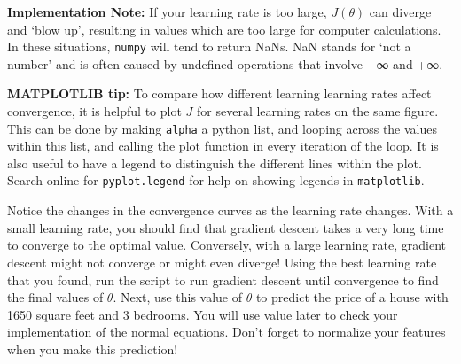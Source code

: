 \documentclass[11pt]{article}
\begin{document}
\textbf{Implementation Note:} If your learning rate is too large,
\(J(\theta)\) can diverge and `blow up', resulting in values which are
too large for computer calculations. In these situations, \texttt{numpy}
will tend to return NaNs. NaN stands for `not a number' and is often
caused by undefined operations that involve −∞ and +∞.

\textbf{MATPLOTLIB tip:} To compare how different learning learning
rates affect convergence, it is helpful to plot \(J\) for several
learning rates on the same figure. This can be done by making
\texttt{alpha} a python list, and looping across the values within this
list, and calling the plot function in every iteration of the loop. It
is also useful to have a legend to distinguish the different lines
within the plot. Search online for \texttt{pyplot.legend} for help on
showing legends in \texttt{matplotlib}.

Notice the changes in the convergence curves as the learning rate
changes. With a small learning rate, you should find that gradient
descent takes a very long time to converge to the optimal value.
Conversely, with a large learning rate, gradient descent might not
converge or might even diverge! Using the best learning rate that you
found, run the script to run gradient descent until convergence to find
the final values of \(\theta\). Next, use this value of \(\theta\) to
predict the price of a house with 1650 square feet and 3 bedrooms. You
will use value later to check your implementation of the normal
equations. Don't forget to normalize your features when you make this
prediction!
\end{document}
